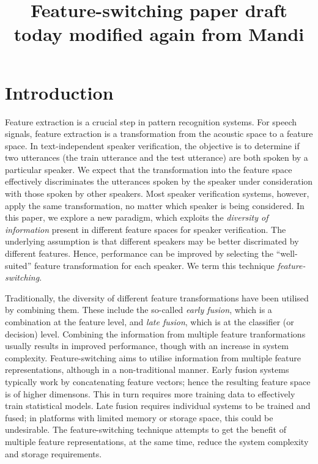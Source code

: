 \documentclass{article}
\title{Feature-switching paper draft today modified again from Mandi}
\begin{document}
\section{Introduction}
Feature extraction is a crucial step in pattern recognition systems. For
speech signals, feature extraction is a transformation from the acoustic space
to a feature space. In text-independent speaker verification, the objective is
to determine if two utterances (the train utterance and the test utterance) are
both spoken by a particular speaker. We expect that the transformation into the
feature space effectively discriminates the utterances spoken by the speaker
under consideration with those spoken by other speakers. Most speaker
verification systems, however, apply the same transformation, no matter which
speaker is being considered. In this paper, we explore a new paradigm, which
exploits the \emph{diversity of information} present in different feature spaces
for speaker verification. The underlying assumption is that different speakers
may be better discrimated by different features. Hence, performance can
be improved by selecting the ``well-suited'' feature transformation for
each speaker. We term this technique \emph{feature-switching}. 

Traditionally, the diversity of different feature transformations have been
utilised by combining them. These include the so-called \emph{early fusion},
which is a combination at the feature level, and \emph{late fusion}, which is at
the classifier (or decision) level. Combining the information from multiple
feature tranformations usually results in improved performance, though
with an increase in system complexity. Feature-switching aims to utilise
information from multiple feature representations, although in a non-traditional
manner. Early fusion systems typically work by concatenating feature vectors;
hence the resulting feature space is of higher dimensons. This in turn requires
more training data to effectively train statistical models. Late fusion requires
individual systems to be trained and fused; in platforms with limited memory or
storage space, this could be undesirable. The feature-switching technique
attempts to get the benefit of multiple feature representations, at the same
time, reduce the system complexity and storage requirements.
\end{document}
